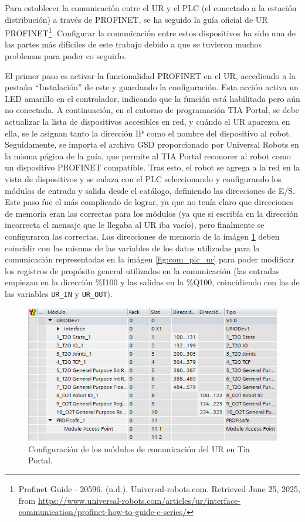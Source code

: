 Para establecer la comunicación entre el UR y el PLC (el conectado a la estación distribución) a través de PROFINET, se ha seguido la guía oficial de UR PROFINET\footnote{Profinet Guide - 20596. (n.d.). Universal-robots.com. Retrieved June 25, 2025, from \url{https://www.universal-robots.com/articles/ur/interface-communication/profinet-how-to-guide-e-series/}}. Configurar la comunicación entre estos dispositivos ha sido una de las partes más difíciles de este trabajo debido a que se tuvieron muchos problemas para poder co seguirlo.

El primer paso es activar la funcionalidad PROFINET en el UR, accediendo a la pestaña “Instalación” de este y guardando la configuración. Esta acción activa un LED amarillo en el controlador, indicando que la función está habilitada pero aún no conectada. A continuación, en el entorno de programación TIA Portal, se debe actualizar la lista de dispositivos accesibles en red, y cuándo el UR aparezca en ella, se le asignan tanto la dirección IP como el nombre del dispositivo al robot. Seguidamente, se importa el archivo GSD proporcionado por Universal Robots en la misma página de la guía, que permite al TIA Portal reconocer al robot como un dispositivo PROFINET compatible. Tras esto, el robot se agrega a la red en la vista de dispositivos y se enlaza con el PLC seleccionando y configurando los módulos de entrada y salida desde el catálogo, definiendo las direcciones de E/S. Este paso fue el más complicado de lograr, ya que no tenía claro que direcciones de memoria eran las correctas para los módulos (ya que si escribía en la dirección incorrecta el mensaje que le llegaba al UR iba vacío), pero finalmente se configuraron las correctas. Las direcciones de memoria de la imágen \ref{fig:com_ur_modulos} deben coincidir con las mismas de las variables de los datos utilizadas para la comunicación representadas en la imágen \ref{fig:com_plc_ur} para poder modificar los registros de propósito general utilizados en la comunicación (las entradas empiezan en la dirección \%I100 y las salidas en la \%Q100, coincidiendo con las de las variables \texttt{UR\_IN} y \texttt{UR\_OUT}). \\

\begin{figure} [h!]
  \begin{center}
    \includegraphics[width=15cm]{figs/com_ur_modulos}
  \end{center}
  \caption{\centering Configuración de los módulos de comunicación del UR en Tia Portal.}
  \label{fig:com_ur_modulos}
\end{figure} 

